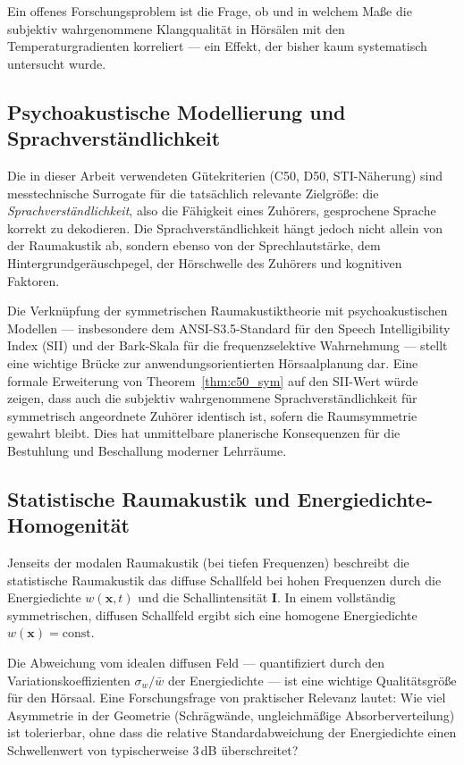 ﻿\documentclass[12pt, a4paper]{article}
\theoremstyle{definition}
\theoremstyle{remark}
\begin{document}
Ein offenes Forschungsproblem ist die Frage, ob und in welchem Maße
die subjektiv wahrgenommene Klangqualität in Hörsälen mit den
Temperaturgradienten korreliert --- ein Effekt, der bisher kaum
systematisch untersucht wurde.

\subsection{Psychoakustische Modellierung und Sprachverständlichkeit}

Die in dieser Arbeit verwendeten Gütekriterien (C50, D50, STI-Näherung)
sind messtechnische Surrogate für die tatsächlich relevante Zielgröße:
die \emph{Sprachverständlichkeit}, also die Fähigkeit eines Zuhörers,
gesprochene Sprache korrekt zu dekodieren. Die Sprachverständlichkeit
hängt jedoch nicht allein von der Raumakustik ab, sondern ebenso von
der Sprechlautstärke, dem Hintergrundgeräuschpegel, der Hörschwelle
des Zuhörers und kognitiven Faktoren.

Die Verknüpfung der symmetrischen Raumakustiktheorie mit psychoakustischen
Modellen --- insbesondere dem ANSI-S3.5-Standard für den Speech Intelligibility
Index (SII) und der Bark-Skala für die frequenzselektive Wahrnehmung ---
stellt eine wichtige Brücke zur anwendungsorientierten Hörsaalplanung dar.
Eine formale Erweiterung von Theorem~\ref{thm:c50_sym} auf den
SII-Wert würde zeigen, dass auch die subjektiv wahrgenommene Sprachverständlichkeit
für symmetrisch angeordnete Zuhörer identisch ist, sofern die Raumsymmetrie
gewahrt bleibt. Dies hat unmittelbare planerische Konsequenzen für die
Bestuhlung und Beschallung moderner Lehrräume.

\subsection{Statistische Raumakustik und Energiedichte-Homogenität}

Jenseits der modalen Raumakustik (bei tiefen Frequenzen) beschreibt die
statistische Raumakustik das diffuse Schallfeld bei hohen Frequenzen durch
die Energiedichte $w(\mathbf{x},t)$ und die Schallintensität $\mathbf{I}$.
In einem vollständig symmetrischen, diffusen Schallfeld ergibt sich eine
homogene Energiedichte $w(\mathbf{x}) = \mathrm{const.}$

Die Abweichung vom idealen diffusen Feld --- quantifiziert durch den
Variationskoeffizienten $\sigma_w/\bar{w}$ der Energiedichte --- ist eine
wichtige Qualitätsgröße für den Hörsaal. Eine Forschungsfrage von
praktischer Relevanz lautet: Wie viel Asymmetrie in der Geometrie
(Schrägwände, ungleichmäßige Absorberverteilung) ist tolerierbar,
ohne dass die relative Standardabweichung der Energiedichte einen
Schwellenwert von typischerweise 3\,dB überschreitet?
\end{document}
